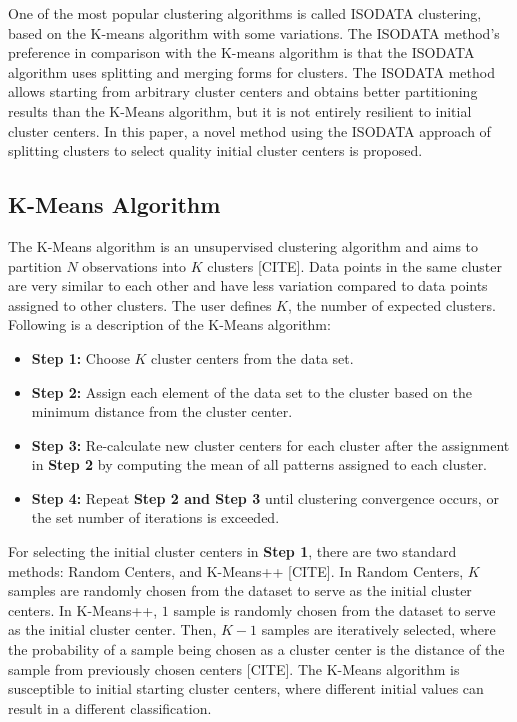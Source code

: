 \documentclass[twoside,twocolumn]{article}
\begin{document}
One of the most popular clustering algorithms is called ISODATA clustering,
based on the K-means algorithm with some variations. The ISODATA method's
preference in comparison with the K-means algorithm is that the ISODATA
algorithm uses splitting and merging forms for clusters. The ISODATA method
allows starting from arbitrary cluster centers and obtains better partitioning
results than the K-Means algorithm, but it is not entirely resilient to initial
cluster centers. In this paper, a novel method using the ISODATA approach of
splitting clusters to select quality initial cluster centers is proposed.



\subsection{K-Means Algorithm}

The K-Means algorithm is an unsupervised clustering algorithm and aims to
partition $N$ observations into $K$ clusters [CITE]. Data points in the same
cluster are very similar to each other and have less variation compared to data
points assigned to other clusters. The user defines $K$, the number of expected
clusters. Following is a description of the K-Means algorithm:

\begin{itemize}
  \item \textbf{Step 1:} Choose $K$ cluster centers from the data set.
  \item \textbf{Step 2:} Assign each element of the data set to the cluster based
        on the minimum distance from the cluster center.
  \item \textbf{Step 3:} Re-calculate new cluster centers for each cluster after
        the assignment in \textbf{Step 2} by computing the mean of all patterns
        assigned to each cluster.
  \item \textbf{Step 4:} Repeat \textbf{Step 2 and Step 3} until clustering
        convergence occurs, or the set number of iterations is exceeded.
\end{itemize}

For selecting the initial cluster centers in \textbf{Step 1}, there are two
standard methods: Random Centers, and K-Means++ [CITE]. In Random Centers, $K$
samples are randomly chosen from the dataset to serve as the initial cluster
centers. In K-Means++, $1$ sample is randomly chosen from the dataset to serve
as the initial cluster center. Then, $K-1$ samples are iteratively selected,
where the probability of a sample being chosen as a cluster center is the
distance of the sample from previously chosen centers [CITE]. The K-Means
algorithm is susceptible to initial starting cluster centers, where different
initial values can result in a different classification.
\end{document}
